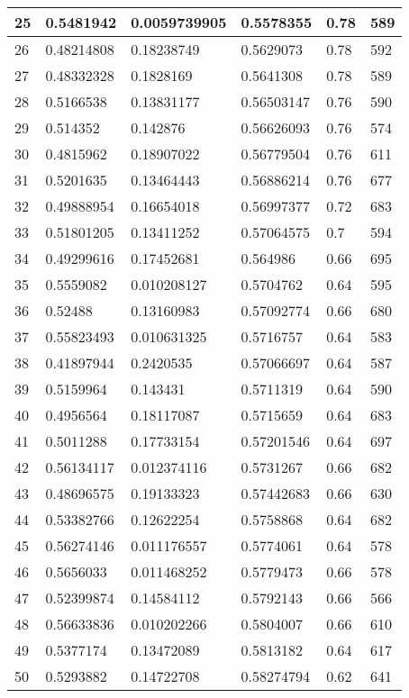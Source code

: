 \begin{longtable}{|l|l|l|l|l|l|}
25 & 0.5481942 & 0.0059739905 & 0.5578355 & 0.78 & 589 \\ \hline 
26 & 0.48214808 & 0.18238749 & 0.5629073 & 0.78 & 592 \\ \hline 
27 & 0.48332328 & 0.1828169 & 0.5641308 & 0.78 & 589 \\ \hline 
28 & 0.5166538 & 0.13831177 & 0.56503147 & 0.76 & 590 \\ \hline 
29 & 0.514352 & 0.142876 & 0.56626093 & 0.76 & 574 \\ \hline 
30 & 0.4815962 & 0.18907022 & 0.56779504 & 0.76 & 611 \\ \hline 
31 & 0.5201635 & 0.13464443 & 0.56886214 & 0.76 & 677 \\ \hline 
32 & 0.49888954 & 0.16654018 & 0.56997377 & 0.72 & 683 \\ \hline 
33 & 0.51801205 & 0.13411252 & 0.57064575 & 0.7 & 594 \\ \hline 
34 & 0.49299616 & 0.17452681 & 0.564986 & 0.66 & 695 \\ \hline 
35 & 0.5559082 & 0.010208127 & 0.5704762 & 0.64 & 595 \\ \hline 
36 & 0.52488 & 0.13160983 & 0.57092774 & 0.66 & 680 \\ \hline 
37 & 0.55823493 & 0.010631325 & 0.5716757 & 0.64 & 583 \\ \hline 
38 & 0.41897944 & 0.2420535 & 0.57066697 & 0.64 & 587 \\ \hline 
39 & 0.5159964 & 0.143431 & 0.5711319 & 0.64 & 590 \\ \hline 
40 & 0.4956564 & 0.18117087 & 0.5715659 & 0.64 & 683 \\ \hline 
41 & 0.5011288 & 0.17733154 & 0.57201546 & 0.64 & 697 \\ \hline 
42 & 0.56134117 & 0.012374116 & 0.5731267 & 0.66 & 682 \\ \hline 
43 & 0.48696575 & 0.19133323 & 0.57442683 & 0.66 & 630 \\ \hline 
44 & 0.53382766 & 0.12622254 & 0.5758868 & 0.64 & 682 \\ \hline 
45 & 0.56274146 & 0.011176557 & 0.5774061 & 0.64 & 578 \\ \hline 
46 & 0.5656033 & 0.011468252 & 0.5779473 & 0.66 & 578 \\ \hline 
47 & 0.52399874 & 0.14584112 & 0.5792143 & 0.66 & 566 \\ \hline 
48 & 0.56633836 & 0.010202266 & 0.5804007 & 0.66 & 610 \\ \hline 
49 & 0.5377174 & 0.13472089 & 0.5813182 & 0.64 & 617 \\ \hline 
50 & 0.5293882 & 0.14722708 & 0.58274794 & 0.62 & 641 \\ \hline 
\end{longtable}